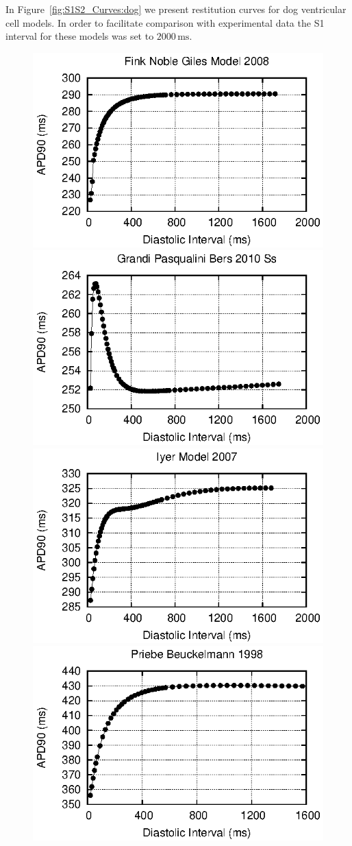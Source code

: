 \documentclass[preprint,authoryear,12pt]{elsarticle}
\newcommand{\vu}[2]{\ensuremath{#1\,\mathrm{#2}}}
\newcommand{\changed}[1]{#1}
\begin{document}
In Figure~\ref{fig:S1S2_Curves:dog} we present restitution curves for dog ventricular cell models.
In order to facilitate comparison with experimental data the S1 interval for these models was set to \vu{2000}{ms}.

\begin{figure}
\begin{center}
\includegraphics[width=0.32\linewidth]{fink_noble_giles_model_2008_s1s2_curve}
\includegraphics[width=0.32\linewidth]{grandi_pasqualini_bers_2010_ss_s1s2_curve}
\includegraphics[width=0.32\linewidth]{iyer_model_2007_s1s2_curve}
\includegraphics[width=0.32\linewidth]{priebe_beuckelmann_1998_s1s2_curve}

\end{center}
\end{figure}
\end{document}
